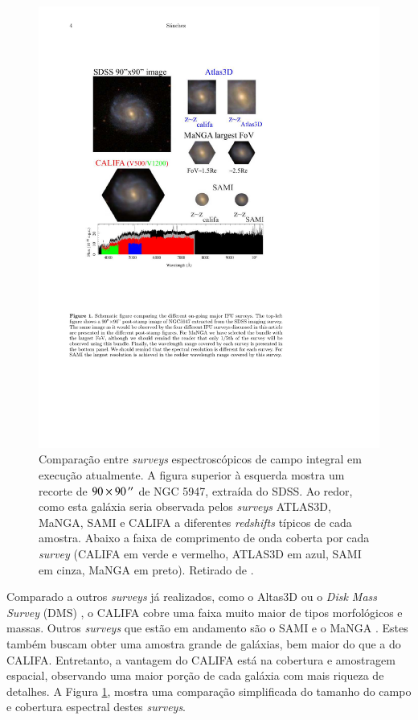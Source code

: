 \begin{figure}
	\includegraphics{figuras/surveysIFS}
	\caption[Comparação entre {\em surveys} espectroscópicos de campo integral]
	{Comparação entre {\em surveys} espectroscópicos de campo integral em execução
	atualmente. A figura superior à esquerda mostra um recorte de $90 \times
	90\,^{\prime\prime}$ de NGC 5947, extraída do SDSS. Ao redor, como esta galáxia seria
	observada pelos {\em surveys} ATLAS3D, MaNGA, SAMI e CALIFA a diferentes {\em
	redshifts} típicos de cada amostra. Abaixo a faixa de comprimento de onda
	coberta por cada {\em survey} (CALIFA em verde e vermelho, ATLAS3D em azul,
	SAMI em cinza, MaNGA em preto). Retirado de \citet{Sanchez2014}.}
	\label{fig:surveysIFS}
\end{figure}

Comparado a outros {\em surveys} já realizados, como o Altas3D
\citep{Cappellari2011} ou o {\em Disk Mass Survey} (DMS) \citep{Bershady2010}, o
CALIFA cobre uma faixa muito maior de tipos morfológicos e massas. Outros {\em
surveys} que estão em andamento são o SAMI \citep{Croom2012, Bryant2015} e o
MaNGA \citep{Bundy2015}. Estes também buscam obter uma amostra grande de
galáxias, bem maior do que a do CALIFA. Entretanto, a vantagem do CALIFA está na
cobertura e amostragem espacial, observando uma maior porção de cada galáxia com
mais riqueza de detalhes. A Figura \ref{fig:surveysIFS}, mostra uma comparação
simplificada do tamanho do campo e cobertura espectral destes {\em surveys}.

